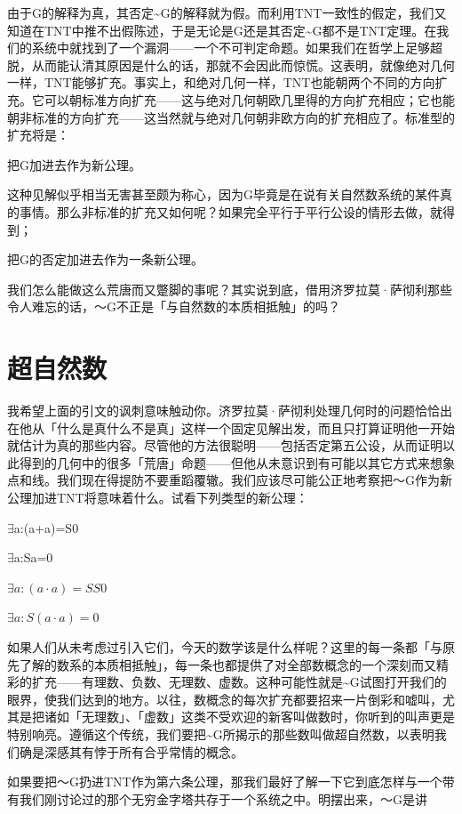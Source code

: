 \documentclass[
  12pt,
  twoside,
  openright,
  oldfontcommands,
]{memoir}
\begin{document}
由于G的解释为真，其否定\textasciitilde G的解释就为假。而利用TNT一致性的假定，我们又知道在TNT中推不出假陈述，于是无论是G还是其否定\textasciitilde G都不是TNT定理。在我们的系统中就找到了一个漏洞------一个不可判定命题。如果我们在哲学上足够超脱，从而能认清其原因是什么的话，那就不会因此而惊慌。这表明，就像绝对几何一样，TNT能够扩充。事实上，和绝对几何一样，TNT也能朝两个不同的方向扩充。它可以朝标准方向扩充------这与绝对几何朝欧几里得的方向扩充相应；它也能朝非标准的方向扩充------这当然就与绝对几何朝非欧方向的扩充相应了。标准型的扩充将是：

把G加进去作为新公理。

这种见解似乎相当无害甚至颇为称心，因为G毕竟是在说有关自然数系统的某件真的事情。那么非标准的扩充又如何呢？如果完全平行于平行公设的情形去做，就得到；

把G的否定加进去作为一条新公理。

我们怎么能做这么荒唐而又蹩脚的事呢？其实说到底，借用济罗拉莫·萨彻利那些令人难忘的话，～G不正是「与自然数的本质相抵触」的吗？

\section{超自然数}

我希望上面的引文的讽刺意味触动你。济罗拉莫·萨彻利处理几何时的问题恰恰出在他从「什么是真什么不是真」这样一个固定见解出发，而且只打算证明他一开始就估计为真的那些内容。尽管他的方法很聪明------包括否定第五公设，从而证明以此得到的几何中的很多「荒唐」命题------但他从未意识到有可能以其它方式来想象点和线。我们现在得提防不要重蹈覆辙。我们应该尽可能公正地考察把～G作为新公理加进TNT将意味着什么。试看下列类型的新公理：

$\exists$a:(a+a)=S0

$\exists$a:Sa=0

$\exists a:(a\cdot a)=SS0$

$\exists a:S(a\cdot a)=0$

如果人们从未考虑过引入它们，今天的数学该是什么样呢？这里的每一条都「与原先了解的数系的本质相抵触」，每一条也都提供了对全部数概念的一个深刻而又精彩的扩充------有理数、负数、无理数、虚数。这种可能性就是\textasciitilde G试图打开我们的眼界，使我们达到的地方。以往，数概念的每次扩充都要招来一片倒彩和嘘叫，尤其是把诸如「无理数」、「虚数」这类不受欢迎的新客叫做数时，你听到的叫声更是特别响亮。遵循这个传统，我们要把\textasciitilde G所揭示的那些数叫做超自然数，以表明我们确是深感其有悖于所有合乎常情的概念。

如果要把～G扔进TNT作为第六条公理，那我们最好了解一下它到底怎样与一个带有我们刚讨论过的那个无穷金字塔共存于一个系统之中。明摆出来，～G是讲
\end{document}
